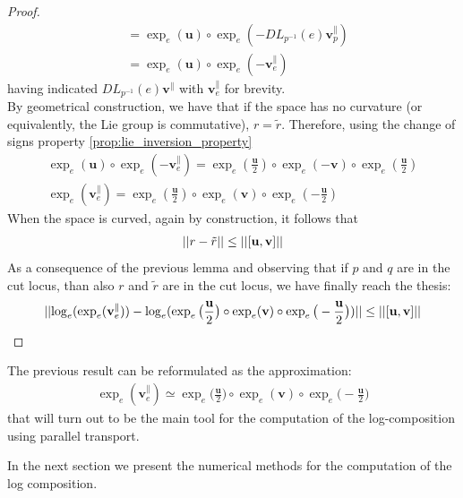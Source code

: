 \begin{proof}
\begin{align*}
		&= \exp_{e}(\mathbf{u})\circ\exp_{e}(-DL_{p^{-1}}(e)\mathbf{v}_{p}^{\parallel}) \\
		&= \exp_{e}(\mathbf{u})\circ \exp_{e}(-\mathbf{v}_{e}^{\parallel})
	\end{align*}
	having indicated $DL_{p^{-1}}(e)\mathbf{v}^{\parallel}$ with $\mathbf{v}_{e}^{\parallel}$ for brevity.\\
	By geometrical construction, we have that if the space has no curvature (or equivalently, the Lie group is commutative), $r=\tilde{r}$. Therefore, using the change of signs property \ref{prop:lie_inversion_property}
	\begin{align*}
		\exp_{e}(\mathbf{u})\circ \exp_{e}(-\mathbf{v}_{e}^{\parallel})
		=
		\exp_{e}(\frac{\mathbf{u}}{2})\circ \exp_{e}(-\mathbf{v})\circ\exp_{e}(\frac{\mathbf{u}}{2})
		\\
		\exp_{e}(\mathbf{v}_{e}^{\parallel})
		=
		\exp_{e}(\frac{\mathbf{u}}{2})\circ \exp_{e}(\mathbf{v})\circ\exp_{e}(-\frac{\mathbf{u}}{2})
	\end{align*}
	When the space is curved, again by construction, it follows that
	\begin{align*}
		\vert\lvert r-\tilde{r} \rvert\vert \leq \vert\lvert [\mathbf{u},\mathbf{v}] \rvert\vert
	\end{align*}
	As a consequence of the previous lemma and observing that if $p$ and $q$ are in the cut locus, than also $r$ and $\tilde{r}$ are in the cut locus, we have finally reach the thesis:
	\begin{align*}
		\vert\lvert 
			\log_{e}(\exp_{e}(\mathbf{v}_{e}^{\parallel} ))
			-
			\log_{e}(\exp_{e}\big(\frac{\mathbf{u}}{2}\big)   
			\circ  \exp_{e}(\mathbf{v}) 
			\circ \exp_{e}\big(-\frac{\mathbf{u}}{2}\big))
		 \rvert\vert 
		\leq
		\vert\lvert [\mathbf{u}, \mathbf{v}] \rvert\vert
	\end{align*}
\end{proof} 

The previous result can be reformulated as the approximation:
\begin{align}\label{eq:parallel_transport_main_approximation}
\exp_{e}(\mathbf{v}_{e}^{\parallel}) 
\simeq
\exp_{e}\big(\frac{\mathbf{u}}{2}\big)   
\circ  \exp_{e}(\mathbf{v}) 
\circ \exp_{e}\big(-\frac{\mathbf{u}}{2}\big)
\end{align}
that will turn out to be the main tool for the computation of the log-composition using parallel transport.

In the next section we present the numerical methods for the computation of the log composition.

